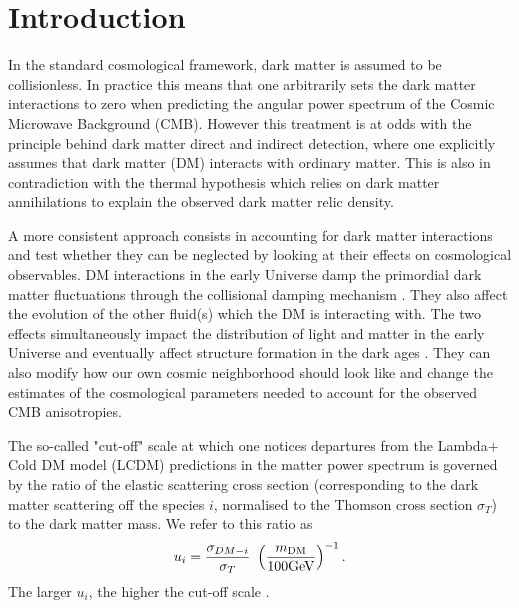 \documentclass[aps,prd,a4paper,twocolumn,amsmath,showpacs,superscriptaddress,nofootinbib,preprintnumbers]{revtex4-1}
\begin{document}
\section{Introduction}
In the standard cosmological framework, dark matter is assumed to be collisionless. In practice this means that one arbitrarily sets the dark matter interactions  to zero when predicting the angular power spectrum of the Cosmic Microwave Background (CMB). However this treatment is at odds with the principle behind dark matter direct and indirect detection, where one explicitly assumes that dark matter (DM) interacts with ordinary matter. This is also in contradiction with the thermal hypothesis which relies on dark matter annihilations to explain the observed dark matter relic density. 

A more consistent approach consists in accounting for dark matter interactions and test whether they can be neglected by looking at their effects on cosmological observables. DM interactions in the early Universe damp the primordial dark matter fluctuations through the collisional damping mechanism \cite{deLaix:1995vi,Boehm:2000gq,Boehm:2004th}. They also affect the evolution of the other fluid(s) which the DM is interacting with. The two effects simultaneously impact the distribution of light and matter in the early Universe \cite{Boehm:2001hm} and eventually affect structure formation in the dark ages \cite{Boehm:2003xr}. They can also modify how our own cosmic neighborhood should look like  \cite{Schewtschenko:2015rno,Schewtschenko:2014fca,Boehm:2014vja,Vogelsberger:2015gpr,Cyr-Racine:2015ihg} and change the estimates of the cosmological parameters needed to account for the observed CMB anisotropies. 

The so-called "cut-off" scale at which one notices departures from the Lambda$+$Cold DM model (LCDM) predictions in the matter power spectrum is governed by the ratio of the elastic scattering cross section (corresponding to the dark matter scattering off the species $i$, normalised to the Thomson cross section $\sigma_T$) to the dark matter mass. We refer to this ratio as $$u_i = \frac{\sigma_{DM-i}}{\sigma_T} \ \left(\frac{m_{\rm{DM}}}{100 \rm{GeV}}\right)^{-1}.$$
The larger $u_i$, the higher the cut-off scale \cite{Boehm:2000gq,Boehm:2001hm,Boehm:2004th}. 
\end{document}
